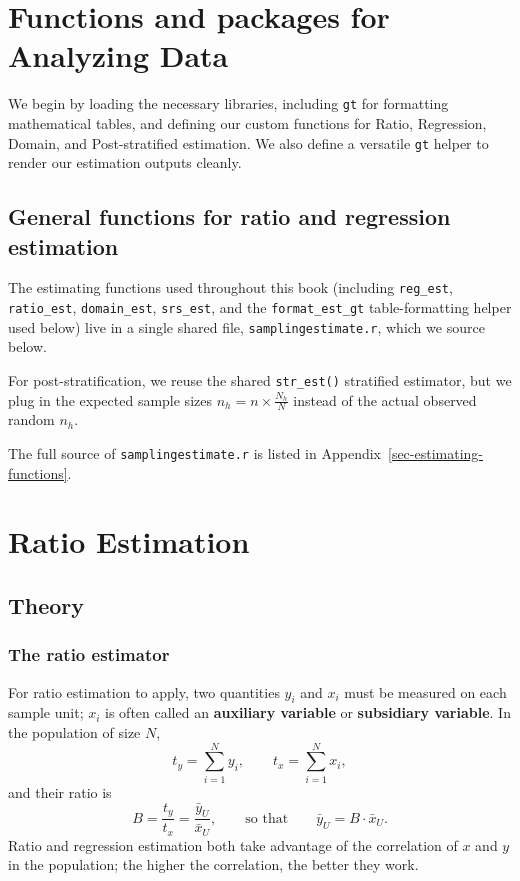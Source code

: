 \documentclass[
  letterpaper,
  DIV=11,
  numbers=noendperiod]{scrreprt}
\renewcommand{\[}{\begin{equation}}
\renewcommand{\]}{\end{equation}}
\begin{document}
\section{Functions and packages for Analyzing
Data}\label{functions-and-packages-for-analyzing-data}

We begin by loading the necessary libraries, including \texttt{gt} for
formatting mathematical tables, and defining our custom functions for
Ratio, Regression, Domain, and Post-stratified estimation. We also
define a versatile \texttt{gt} helper to render our estimation outputs
cleanly.

\subsection{General functions for ratio and regression
estimation}\label{general-functions-for-ratio-and-regression-estimation}

The estimating functions used throughout this book (including
\texttt{reg\_est}, \texttt{ratio\_est}, \texttt{domain\_est},
\texttt{srs\_est}, and the \texttt{format\_est\_gt} table-formatting
helper used below) live in a single shared file,
\texttt{samplingestimate.r}, which we source below.

For post-stratification, we reuse the shared \texttt{str\_est()}
stratified estimator, but we plug in the expected sample sizes
\(n_h = n \times \frac{N_h}{N}\) instead of the actual observed random
\(n_h\).

The full source of \texttt{samplingestimate.r} is listed in
Appendix~\ref{sec-estimating-functions}.

\section{Ratio Estimation}\label{ratio-estimation}

\subsection{Theory}\label{sec-ratio-theory}

\subsubsection{The ratio estimator}\label{the-ratio-estimator}

For ratio estimation to apply, two quantities \(y_i\) and \(x_i\) must
be measured on each sample unit; \(x_i\) is often called an
\textbf{auxiliary variable} or \textbf{subsidiary variable}. In the
population of size \(N\), \[
t_y = \sum_{i=1}^N y_i, \qquad t_x = \sum_{i=1}^N x_i,
\] and their ratio is \[
B = \frac{t_y}{t_x} = \frac{\bar y_U}{\bar x_U}, \qquad \text{so that} \qquad \bar y_U = B\cdot\bar x_U .
\] Ratio and regression estimation both take advantage of the
correlation of \(x\) and \(y\) in the population; the higher the
correlation, the better they work.
\end{document}
